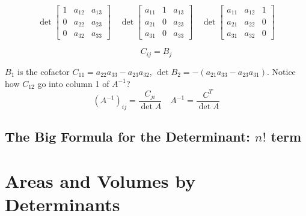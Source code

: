 \[
\det\!\begin{bmatrix}
1 & a_{12} & a_{13}\\
0 & a_{22} & a_{23}\\
0 & a_{32} & a_{33}
\end{bmatrix}\quad
\det\!\begin{bmatrix}
a_{11} & 1 & a_{13}\\
a_{21} & 0 & a_{23}\\
a_{31} & 0 & a_{33}
\end{bmatrix}\quad
\det\!\begin{bmatrix}
a_{11} & a_{12} & 1\\
a_{21} & a_{22} & 0\\
a_{31} & a_{32} & 0
\end{bmatrix}
\]

\[
  C_{ij} = B_j 
\]

\(B_1\) is the cofactor \(C_{11} = a_{22}a_{33} - a_{23}a_{32}\), \(\det B_2 = -(a_{21}a_{33} - a_{23}a_{31})\). Notice how \(C_{12} \) go into column 1 of \(A^{-1} \)? 
\[
  (A^{-1} )_{ij} = \frac{C_{ji} }{\det A} 
  \quad 
  A^{-1} = \frac{C^T}{\det A} 
\]     

\subsection{The Big Formula for the Determinant: \(n!\) term }





\section{Areas and Volumes by Determinants}
